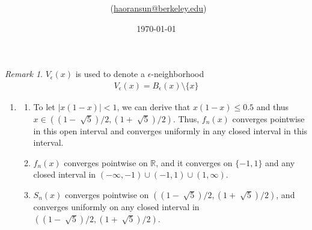 \documentclass[twoside,11pt]{article}
\title{{\sffamily \Code \ \Ass}}
\author{\sffamily \name \ (\href{mailto:haoransun@berkeley.edu}{haoransun@berkeley.edu})}
\date{\sffamily \today}
\makeatletter
\newcommand{\R}{\mathbb{R}}
\theoremstyle{definition}
\theoremstyle{remark}
\newtheorem*{remark}{Remark}
\renewcommand{\maketitle}{\bgroup\setlength{\parindent}{0pt}
\begin{flushleft}
  \textbf{\Large\@title}

  \@author
\end{flushleft}\egroup
}
\makeatother
\begin{document}
\maketitle
\thispagestyle{title}

\begin{remark}
    $V_\epsilon(x)$ is used to denote a $\epsilon$-neighborhood
    \begin{align*}
        V_\epsilon(x) = B_\epsilon(x)\setminus\{x\}
    \end{align*}
\end{remark}

\begin{enumerate}

\item \begin{enumerate}
    \item To let $|x(1-x)|<1$, we can derive that $x(1-x)\leq 0.5$ and thus
    $x\in((1-\sqrt[]{5})/2, (1+\sqrt[]{5})/2)$.
    Thus, $f_n(x)$ converges pointwise in this open interval and 
    converges uniformly in any closed interval in this interval.

    \item $f_n(x)$ converges pointwise on $\R$, and it converges on $\{-1, 1\}$ and any
    closed interval in $(-\infty,-1)\cup (-1,1)\cup (1,\infty)$.

    \item $S_n(x)$ converges pointwise on $((1-\sqrt[]{5})/2, (1+\sqrt[]{5})/2)$,
    and converges uniformly on any closed interval in $((1-\sqrt[]{5})/2, (1+\sqrt[]{5})/2)$.
\end{enumerate}



\end{enumerate}
\end{document}
